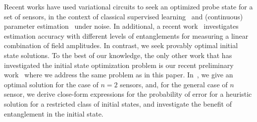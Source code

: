 



Recent works have used variational circuits to seek an optimized probe 
state for a set of sensors, in the context of classical supervised learning~\cite{slaen}
and (continuous) parameter estimation~\cite{Koczor_2020} under noise. 
In additional, a recent work~\cite{ehrenberg} investigates estimation accuracy
with different levels of entanglements 
for measuring a linear combination of field amplitudes.
In contrast, we seek provably optimal initial state solutions. 
To the best of our knowledge, the only other work that has 
investigated the initial state optimization problem is 
our recent preliminary work~\cite{Hillery_2023} where we address the same 
problem as in this paper. 
In~\cite{Hillery_2023}, we give an optimal solution for the case of $n=2$ sensors,
and, for the general case of  $n$ sensor, we derive 
close-form expressions for the probability of error 
for a heuristic solution for a restricted class of initial 
states, and investigate the benefit of entanglement in the
initial state. 

